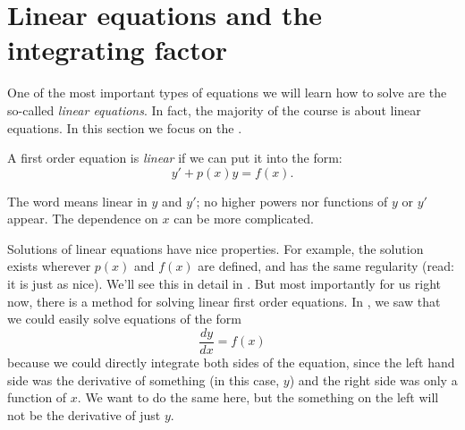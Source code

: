 \section{Linear equations and the integrating factor}
\label{intfactor:section}




One of the most important types of equations we will learn how to solve are
the so-called
\emph{linear equations}.
In fact, the majority of the course is about linear
equations.  In this section we focus on the
\emph{}.

\begin{definition}
A first order equation is \emph{linear} if we can put it
into the form:
\begin{equation} \label{lineq:eq1}
y' + p(x) y = f(x) .
\end{equation}
\end{definition}

The word
 means linear in $y$ and $y'$;
no higher powers nor functions of $y$ or $y'$ appear.
The dependence on $x$ can be more
complicated.

Solutions of linear equations have nice properties.  For example, the
solution exists wherever $p(x)$ and $f(x)$ are defined, and has the same
regularity (read: it is just as nice).  We'll see this in detail in . But most importantly for us right now,
there is a method for solving linear first order equations. 
In , we saw that we could easily 
solve equations of the form \[ \frac{dy}{dx} = f(x) \] because we could 
directly integrate both sides of the equation, since the left hand side 
was the derivative of something (in this case, $y$) and the right side 
was only a function of $x$. We want to do the same here, but the 
something on the left will not be the derivative of just $y$.

